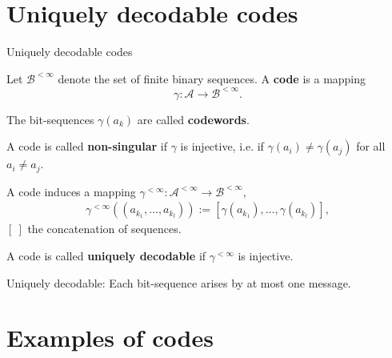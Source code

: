 \section{Uniquely decodable codes}
\begin{frame}{Uniquely decodable codes}
\bit
\item Let $\mathcal{B}^{<\infty}$ denote the set of finite binary sequences. A \textbf{code} is a mapping 
\[
\gamma: \mathcal{A}\longrightarrow \mathcal{B}^{<\infty}. 
\]
\item The bit-sequences $\gamma(a_k)$ are called \textbf{codewords}.
\eit
{}
\bit
\item A code is called \textbf{non-singular} if  $\gamma$ is injective, i.e. if 
$\gamma(a_i)\neq \gamma(a_j)$ for all $ a_i\neq a_j$. 
\eit 
{}
\bit
\item A code induces a mapping $\gamma^{<\infty}:\mathcal{A}^{<\infty}\to\mathcal{B}^{<\infty}$, 
\begin{align*}
\gamma^{<\infty}\left((a_{k_1},\dots,a_{k_l})\right):=\left[\gamma(a_{k_1}),\dots,\gamma(a_{k_l})\right],
\end{align*}
$[\:]$ the concatenation of sequences. 
\item A code is called \textbf{uniquely decodable} if $\gamma^{<\infty}$ is injective.
\item Uniquely decodable: Each bit-sequence arises by at most one message. 
\eit
\end{frame}

\section{Examples of codes}




